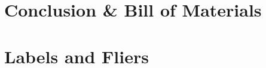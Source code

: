 \documentclass[11pt,oneside]{book}
\begin{document}
\chapter{Conclusion \& Bill of Materials}

\newpage

\chapter{Labels and Fliers}
\newpage

 

\printbibliography[heading=bibintoc,title={References}]
\end{document}

